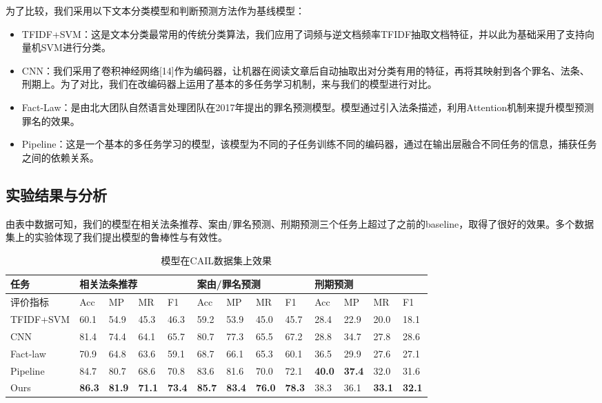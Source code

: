 为了比较，我们采用以下文本分类模型和判断预测方法作为基线模型：

\begin{itemize}
	\item TFIDF+SVM：这是文本分类最常用的传统分类算法，我们应用了词频与逆文档频率TFIDF抽取文档特征，并以此为基础采用了支持向量机SVM进行分类。
	\item CNN：我们采用了卷积神经网络[14]作为编码器，让机器在阅读文章后自动抽取出对分类有用的特征，再将其映射到各个罪名、法条、刑期上。为了对比，我们在改编码器上运用了基本的多任务学习机制，来与我们的模型进行对比。
	\item Fact-Law：是由北大团队自然语言处理团队在2017年提出的罪名预测模型。模型通过引入法条描述，利用Attention机制来提升模型预测罪名的效果。
	\item Pipeline：这是一个基本的多任务学习的模型，该模型为不同的子任务训练不同的编码器，通过在输出层融合不同任务的信息，捕获任务之间的依赖关系。
\end{itemize}



\subsection{实验结果与分析}
由表中数据可知，我们的模型在相关法条推荐、案由/罪名预测、刑期预测三个任务上超过了之前的baseline，取得了很好的效果。多个数据集上的实验体现了我们提出模型的鲁棒性与有效性。

\begin{table}[]
\begin{tabular}{l|llll|llll|llll}
\hline
任务        & \multicolumn{4}{l}{相关法条推荐} & \multicolumn{4}{l|}{案由/罪名预测} & \multicolumn{4}{l}{刑期预测}  \\
\hline
评价指标      & Acc   & MP   & MR   & F1   & Acc   & MP    & MR   & F1   & Acc  & MP   & MR   & F1   \\ \hline
TFIDF+SVM & 60.1  & 54.9 & 45.3 & 46.3 & 59.2  & 53.9  & 45.0 & 45.7 & 28.4 & 22.9 & 20.0 & 18.1 \\
CNN       & 81.4  & 74.4 & 64.1 & 65.7 & 80.7  & 77.3  & 65.5 & 67.2 & 28.8 & 34.7 & 27.8 & 28.6 \\
Fact-law  & 70.9  & 64.8 & 63.6 & 59.1 & 68.7  & 66.1  & 65.3 & 60.1 & 36.5 & 29.9 & 27.6 & 27.1 \\
Pipeline  & 84.7  & 80.7 & 68.6 & 70.8 & 83.6  & 81.6  & 70.0 & 72.1 & \textbf{40.0}   & \textbf{37.4} & 32.0 & 31.6 \\ \hline
Ours      & \textbf{86.3}  & \textbf{81.9} & \textbf{71.1} & \textbf{73.4} & \textbf{85.7}  & \textbf{83.4}  & \textbf{76.0}   & \textbf{78.3} & 38.3 & 36.1 & \textbf{33.1} & \textbf{32.1} \\ \hline
\end{tabular}
\caption{模型在CAIL数据集上效果}
\label{table: result_judge_cail}
\end{table}

